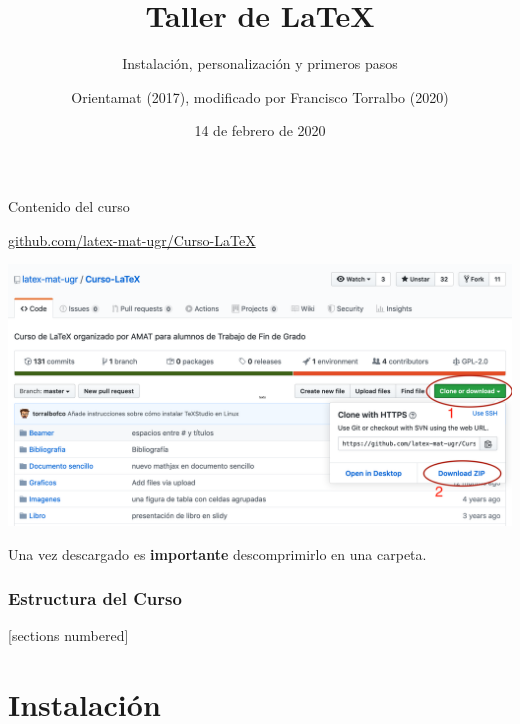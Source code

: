 \documentclass[10pt,xcolor=svgnames]{beamer}
\title{Taller de \LaTeX}
\subtitle{Instalación, personalización y primeros pasos}
\author{Orientamat (2017), modificado por Francisco Torralbo (2020)}
\institute{Universidad de Granada}
\date[2020]{14 de febrero de 2020}
\begin{document}
\maketitle





\begin{frame}{Contenido del curso}

  {\Large\url{github.com/latex-mat-ugr/Curso-LaTeX}}

  \begin{center}
  \includegraphics[width=\linewidth]{github} 
  \end{center}

Una vez descargado es \textbf{importante} descomprimirlo en una carpeta.
\end{frame}

\begin{frame}
  \frametitle{Estructura del Curso}
  [sections numbered]
  \tableofcontents[hideallsubsections]
\end{frame}





\section{Instalación}
\end{document}
